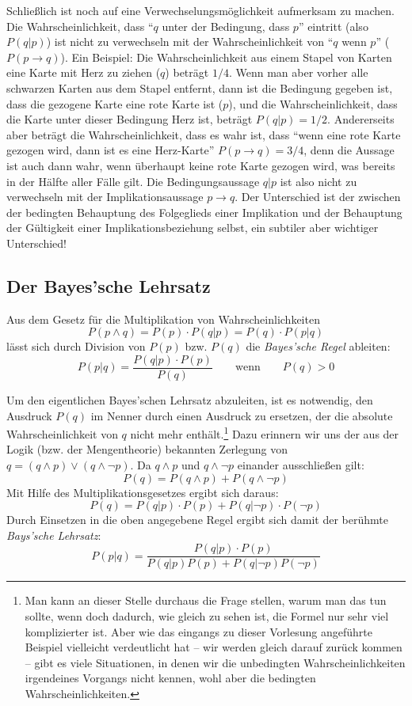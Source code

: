 Schließlich ist noch auf eine Verwechselungsmöglichkeit aufmerksam zu machen. Die
Wahrscheinlichkeit,
dass "`$q$ unter der Bedingung, dass $p$"' eintritt (also $P(q|p)$) ist nicht zu
verwechseln mit der Wahrscheinlichkeit von "`$q$ wenn $p$"' ($P(p \rightarrow
q)$). Ein Beispiel: Die Wahrscheinlichkeit aus einem Stapel von Karten eine Karte
mit Herz zu ziehen ($q$) beträgt $1/4$. Wenn man aber vorher alle schwarzen
Karten aus dem Stapel entfernt, dann ist die Bedingung gegeben ist, dass die
gezogene Karte eine rote Karte ist ($p$), und die Wahrscheinlichkeit, dass die
Karte unter dieser Bedingung Herz ist, beträgt $P(q|p) = 1/2$. Andererseits aber
beträgt die Wahrscheinlichkeit, dass es wahr ist, dass "`wenn eine rote Karte gezogen
wird, dann ist es eine Herz-Karte"' $P(p \rightarrow q) = 3/4$, denn die Aussage
ist auch dann wahr, wenn überhaupt keine rote Karte gezogen wird, was bereits in
der Hälfte aller Fälle gilt. Die Bedingungsaussage $q|p$ ist also nicht zu
verwechseln mit der Implikationsaussage $p \rightarrow q$. Der Unterschied ist
der zwischen der bedingten Behauptung des Folgeglieds einer Implikation und der
Behauptung der Gültigkeit einer Implikationsbeziehung selbst, ein subtiler aber
wichtiger Unterschied!


\subsection{Der Bayes'sche Lehrsatz}

Aus dem Gesetz für die Multiplikation von Wahrscheinlichkeiten 
\[ P(p \wedge q) = P(p)\cdot P(q|p) = P(q)\cdot P(p|q) \]
lässt sich durch Division von $P(p)$ bzw. $P(q)$ die {\em Bayes'sche Regel}
ableiten:\label{BayesRegel}
\[ P(p|q) = \frac{P(q|p)\cdot P(p)}{P(q)} \qquad \mbox{wenn} \qquad P(q) > 0\]

Um den eigentlichen Bayes'schen Lehrsatz abzuleiten, ist es notwendig, den
Ausdruck $P(q)$ im Nenner durch einen Ausdruck zu ersetzen, der die absolute
Wahrscheinlichkeit von $q$ nicht mehr enthält.\footnote{Man kann an dieser Stelle
durchaus die Frage stellen, warum man das tun sollte, wenn doch dadurch, wie
gleich zu sehen ist, die Formel nur sehr viel komplizierter ist. Aber wie das
eingangs zu dieser Vorlesung angeführte Beispiel vielleicht verdeutlicht hat --
wir werden gleich darauf zurück kommen -- gibt es viele Situationen, in denen wir
die unbedingten Wahrscheinlichkeiten irgendeines Vorgangs nicht kennen, wohl aber
die bedingten Wahrscheinlichkeiten.} Dazu erinnern wir uns der aus der Logik
(bzw. der Mengentheorie) bekannten Zerlegung von $q = (q \wedge p) \vee (q \wedge
\neg p)$. Da $q \wedge p$ und $q \wedge \neg p$ einander ausschließen gilt: \[
P(q) = P(q \wedge p) + P(q \wedge \neg p) \] Mit Hilfe des
Multiplikationsgesetzes ergibt sich daraus: \[ P(q) = P(q|p)\cdot P(p) + P(q|\neg
p)\cdot P(\neg p) \] Durch Einsetzen in die oben angegebene Regel ergibt sich
damit der berühmte {\em Bays'sche
Lehrsatz}:\label{BayesTheorem} \[ P(p|q) =
\frac{P(q|p)\cdot P(p)}{P(q|p)P(p) + P(q|\neg p)P(\neg p)} \]

